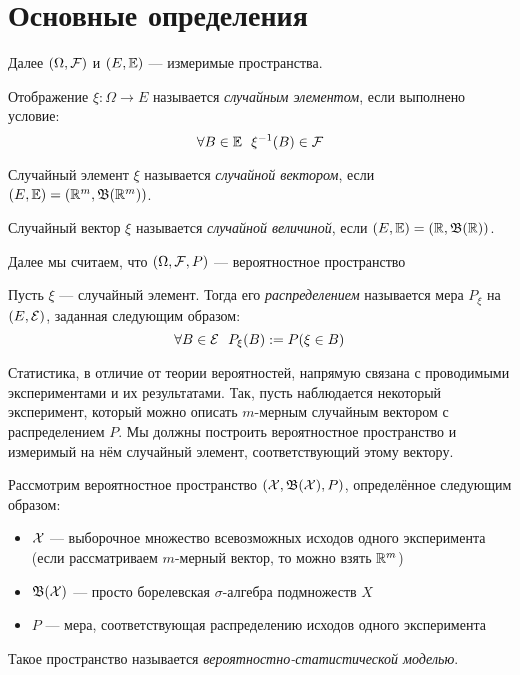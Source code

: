 \section{Основные определения}

\begin{note}
	Далее $(\Omega, \mathcal{F})$ и $(E, \mathbb{E})$ --- измеримые пространства.
\end{note}

\begin{definition}
	Отображение $\xi \colon \Omega \to E$ называется \textit{случайным элементом}, если выполнено условие:
	\[
		\forall B \in \mathbb{E}\ \ \xi^{-1}(B) \in \mathcal{F}
	\]
\end{definition}

\begin{definition}
	Случайный элемент $\xi$ называется \textit{случайной вектором}, если $(E, \mathbb{E}) = (\mathbb{R}^m, \mathfrak{B}(\mathbb{R}^m))$.
\end{definition}

\begin{definition}
	Случайный вектор $\xi$ называется \textit{случайной величиной}, если $(E, \mathbb{E}) = (\mathbb{R}, \mathfrak{B}(\mathbb{R}))$.
\end{definition}

\begin{note}
	Далее мы считаем, что $(\Omega, \mathcal{F}, P)$ --- вероятностное пространство
\end{note}

\begin{definition}
	Пусть $\xi$ --- случайный элемент. Тогда его \textit{распределением} называется мера $P_\xi$ на $(E, \mathcal{E})$, заданная следующим образом:
	\[
		\forall B \in \mathcal{E}\ \ P_\xi(B) := P(\xi \in B)
	\]
\end{definition}

\begin{note}
	Статистика, в отличие от теории вероятностей, напрямую связана с проводимыми экспериментами и их результатами. Так, пусть наблюдается некоторый эксперимент, который можно описать $m$-мерным случайным вектором с распределением $P$. Мы должны построить вероятностное пространство и измеримый на нём случайный элемент, соответствующий этому вектору. 
\end{note}

\begin{definition}
	Рассмотрим вероятностное пространство $(\mathcal{X}, \mathfrak{B}(\mathcal{X}), P)$, определённое следующим образом:
	\begin{itemize}
		\item $\mathcal{X}$ --- выборочное множество всевозможных исходов одного эксперимента (если рассматриваем $m$-мерный вектор, то можно взять $\mathbb{R}^m$)
		
		\item $\mathfrak{B}(\mathcal{X})$ --- просто борелевская $\sigma$-алгебра подмножеств $X$
		
		\item $P$ --- мера, соответствующая распределению исходов одного эксперимента
	\end{itemize}
	Такое пространство называется \textit{вероятностно-статистической моделью}.
\end{definition}

